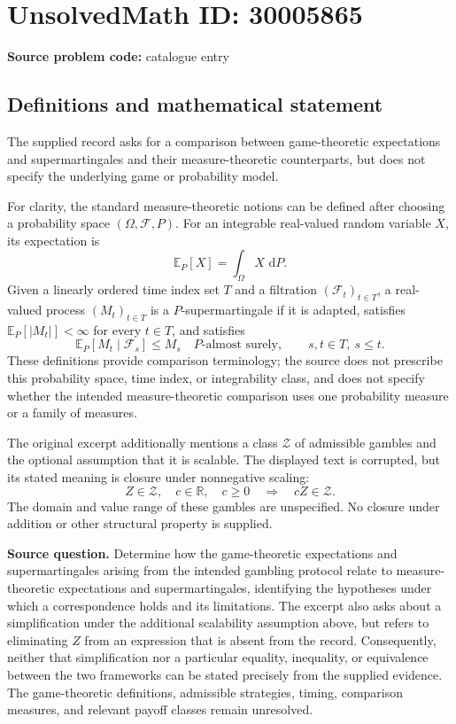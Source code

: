 \documentclass[11pt]{article}
\newcommand{\R}{\mathbb{R}}
\newcommand{\dd}{\,\mathrm{d}}
\begin{document}
\section*{UnsolvedMath ID: 30005865}
\textbf{Source problem code:} catalogue entry
\subsection{Definitions and mathematical statement}
The supplied record asks for a comparison between game-theoretic expectations and supermartingales and their measure-theoretic counterparts, but does not specify the underlying game or probability model.

For clarity, the standard measure-theoretic notions can be defined after choosing a probability space \((\Omega,\mathcal F,P)\). For an integrable real-valued random variable \(X\), its expectation is
\[
\mathbb E_P[X]=\int_\Omega X\,\dd P.
\]
Given a linearly ordered time index set \(T\) and a filtration \((\mathcal F_t)_{t\in T}\), a real-valued process \((M_t)_{t\in T}\) is a \(P\)-supermartingale if it is adapted, satisfies \(\mathbb E_P[|M_t|]<\infty\) for every \(t\in T\), and satisfies
\[
\mathbb E_P[M_t\mid\mathcal F_s]\leq M_s
\quad P\text{-almost surely},\qquad s,t\in T,\ s\leq t.
\]
These definitions provide comparison terminology; the source does not prescribe this probability space, time index, or integrability class, and does not specify whether the intended measure-theoretic comparison uses one probability measure or a family of measures.

The original excerpt additionally mentions a class \(\mathcal Z\) of admissible gambles and the optional assumption that it is scalable. The displayed text is corrupted, but its stated meaning is closure under nonnegative scaling:
\[
Z\in\mathcal Z,\quad c\in\R,\quad c\geq0
\quad\Longrightarrow\quad cZ\in\mathcal Z.
\]
The domain and value range of these gambles are unspecified. No closure under addition or other structural property is supplied.

\textbf{Source question.} Determine how the game-theoretic expectations and supermartingales arising from the intended gambling protocol relate to measure-theoretic expectations and supermartingales, identifying the hypotheses under which a correspondence holds and its limitations. The excerpt also asks about a simplification under the additional scalability assumption above, but refers to eliminating \(Z\) from an expression that is absent from the record. Consequently, neither that simplification nor a particular equality, inequality, or equivalence between the two frameworks can be stated precisely from the supplied evidence. The game-theoretic definitions, admissible strategies, timing, comparison measures, and relevant payoff classes remain unresolved.
\end{document}
